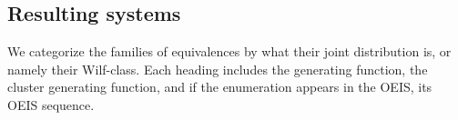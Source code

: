 \documentclass[a4paper, 11pt, english]{article}
\theoremstyle{definition}
\begin{document}
\begin{appendices}

\clearpage

\section{Resulting systems}
We categorize the families of equivalences by what their joint
distribution is, or namely their Wilf-class.
Each heading includes the generating function, the cluster generating function, and if the enumeration
appears in the OEIS, its OEIS sequence.

\begin{multicols}{2}

\end{multicols}
\end{appendices}
\end{document}
